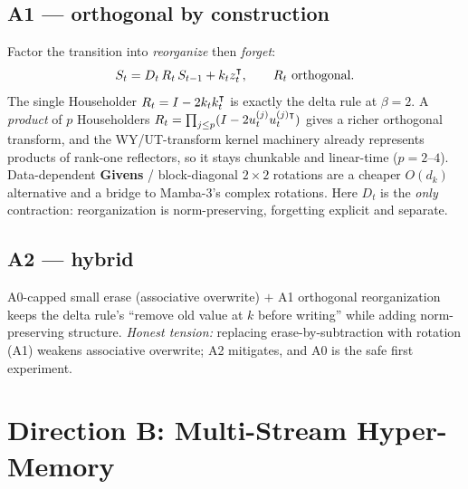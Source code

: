 \documentclass[11pt,letterpaper,logo]{yalearxiv}
\begin{document}
\subsection{A1 --- orthogonal by construction}
Factor the transition into \emph{reorganize} then \emph{forget}:
\begin{equation}
  S_t = D_t\, R_t\, S_{t-1} + k_t z_t^{\intercal}, \qquad R_t \text{ orthogonal}.
  \label{eq:a1}
\end{equation}
The single Householder $R_t = I - 2 k_t k_t^{\intercal}$ is exactly the delta rule at $\beta=2$.
A \emph{product} of $p$ Householders
$R_t = \prod_{j \le p}(I - 2 u_t^{(j)} u_t^{(j)\intercal})$ gives a richer orthogonal transform,
and the WY/UT-transform kernel machinery already represents products of rank-one
reflectors, so it stays chunkable and linear-time ($p = 2\text{--}4$). Data-dependent
\textbf{Givens} / block-diagonal $2\times2$ rotations are a cheaper $O(d_k)$ alternative and
a bridge to Mamba-3's complex rotations. Here $D_t$ is the \emph{only} contraction:
reorganization is norm-preserving, forgetting explicit and separate.

\subsection{A2 --- hybrid}
A0-capped small erase (associative overwrite) $+$ A1 orthogonal reorganization keeps the
delta rule's ``remove old value at $k$ before writing'' while adding norm-preserving
structure. \emph{Honest tension:} replacing erase-by-subtraction with rotation (A1) weakens
associative overwrite; A2 mitigates, and A0 is the safe first experiment.


\section{Direction B: Multi-Stream Hyper-Memory}
\label{sec:dirB}
\end{document}
